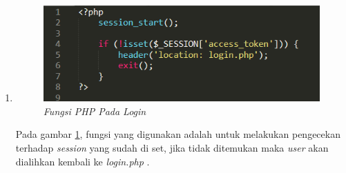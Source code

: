 \begin{enumerate}
\item 
\begin{figure}[!htbp]
    \centering
    \includegraphics[scale=0.5]{gambar/loginphp}
    \caption{\textit{Fungsi \textit{PHP} Pada \textit{Login}}}
    \label{loginphp}
\end{figure}
\par 
Pada gambar \ref{loginphp}, fungsi yang digunakan adalah untuk melakukan pengecekan terhadap \textit{session} yang sudah di set, jika tidak ditemukan maka \textit{user} akan dialihkan kembali ke \textit{login.php} .


\end{enumerate}
